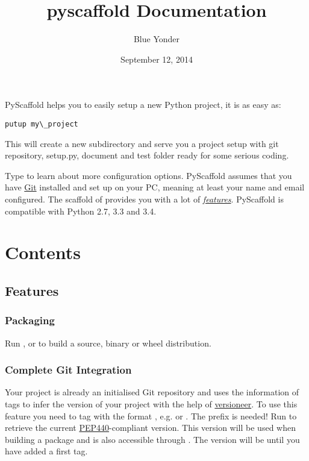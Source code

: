 \documentclass[letterpaper,10pt,english]{sphinxmanual}
\title{pyscaffold Documentation}
\date{September 12, 2014}
\author{Blue Yonder}
\begin{document}
\maketitle
\tableofcontents
{}\label{index::doc}


PyScaffold helps you to easily setup a new Python project, it is as easy as:

\begin{Verbatim}[commandchars=\\\{\}]
putup my\_project
\end{Verbatim}

This will create a new subdirectory  and serve you a project
setup with git repository, setup.py, document and test folder ready for some
serious coding.

Type  to learn about more configuration options. PyScaffold assumes
that you have \href{http://git-scm.com/}{Git} installed and set up on your PC,
meaning at least your name and email configured.
The scaffold of  provides you with a lot of
{\hyperref[features:features]{\emph{features}}}. PyScaffold is compatible with Python 2.7, 3.3 and
3.4.


\chapter{Contents}
\label{index:pyscaffold}\label{index:contents}

\section{Features}
\label{features::doc}\label{features:features}\label{features:id1}

\subsection{Packaging}
\label{features:packaging}
Run ,  or
 to build a source, binary or wheel
distribution.


\subsection{Complete Git Integration}
\label{features:complete-git-integration}
Your project is already an initialised Git repository and  uses
the information of tags to infer the version of your project with the help of
\href{https://github.com/warner/python-versioneer}{versioneer}.
To use this feature you need to tag with the format 
, e.g.  or . The prefix  is needed!
Run  to retrieve the current \href{http://www.python.org/dev/peps/pep-0440/}{PEP440}-compliant version. This version
will be used when building a package and is also accessible through
.
The version will be  until you have added a first tag.
\end{document}

